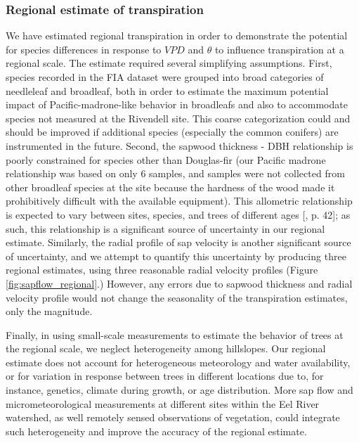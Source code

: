 \subsubsection{Regional estimate of transpiration}
We have estimated regional transpiration in order to demonstrate the potential for species differences in response to $VPD$ and $\theta$ to influence transpiration at a regional scale.  The estimate required several simplifying assumptions.  First, species recorded in the FIA dataset were grouped into broad categories of needleleaf and broadleaf, both in order to estimate the maximum potential impact of Pacific-madrone-like behavior in broadleafs and also to accommodate species not measured at the Rivendell site.  This coarse categorization could and should be improved if additional species (especially the common conifers) are instrumented in the future.  Second, the sapwood thickness - DBH relationship is poorly constrained for species other than Douglas-fir (our Pacific madrone relationship was based on only 6 samples, and samples were not collected from other broadleaf species at the site because the hardness of the wood made it prohibitively difficult with the available equipment).  This allometric relationship is expected to vary between sites, species, and trees of different ages [\cite{eamus}, p. 42]; as such, this relationship is a significant source of uncertainty in our regional estimate.  Similarly, the radial profile of sap velocity is another significant source of uncertainty, and we attempt to quantify this uncertainty by producing three regional estimates, using three reasonable radial velocity profiles (Figure \ref{fig:sapflow_regional}.)  However, any errors due to sapwood thickness and radial velocity profile would not change the seasonality of the transpiration estimates, only the magnitude.

Finally, in using small-scale measurements to estimate the behavior of trees at the regional scale, we neglect heterogeneity among hillslopes.  Our regional estimate does not account for heterogeneous meteorology and water availability, or for variation in response between trees in different locations due to, for instance, genetics, climate during growth, or age distribution.  More sap flow and micrometeorological measurements at different sites within the Eel River watershed, as well remotely sensed observations of vegetation, could integrate such heterogeneity and improve the accuracy of the regional estimate.

